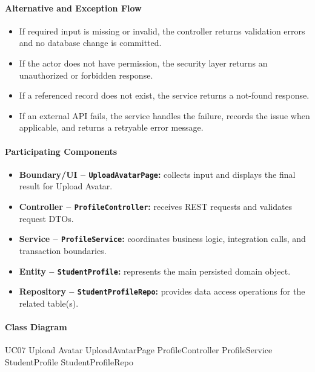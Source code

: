 \paragraph{Alternative and Exception Flow}

\begin{itemize}
    \item If required input is missing or invalid, the controller returns validation errors and no database change is committed.
    \item If the actor does not have permission, the security layer returns an unauthorized or forbidden response.
    \item If a referenced record does not exist, the service returns a not-found response.
    \item If an external API fails, the service handles the failure, records the issue when applicable, and returns a retryable error message.
\end{itemize}

\paragraph{Participating Components}

\begin{itemize}
    \item \textbf{Boundary/UI -- \texttt{UploadAvatarPage}:} collects input and displays the final result for Upload Avatar.
    \item \textbf{Controller -- \texttt{ProfileController}:} receives REST requests and validates request DTOs.
    \item \textbf{Service -- \texttt{ProfileService}:} coordinates business logic, integration calls, and transaction boundaries.
    \item \textbf{Entity -- \texttt{StudentProfile}:} represents the main persisted domain object.
    \item \textbf{Repository -- \texttt{StudentProfileRepo}:} provides data access operations for the related table(s).
\end{itemize}

\paragraph{Class Diagram}

\ClassDiagram
{UC07 Upload Avatar}
{UploadAvatarPage}
{ProfileController}
{ProfileService}
{StudentProfile}
{StudentProfileRepo}

